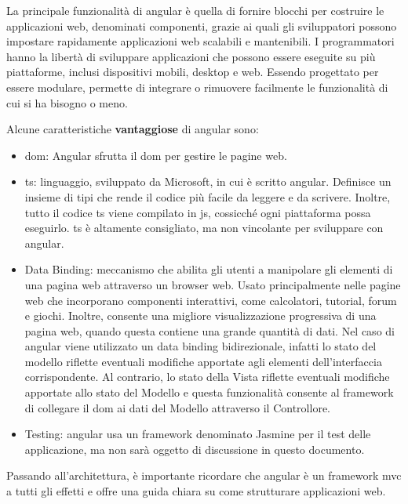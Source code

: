 La principale funzionalità di \gls{angular} è quella di fornire blocchi per costruire le applicazioni web, denominati componenti, grazie ai quali gli sviluppatori possono impostare rapidamente applicazioni web scalabili e mantenibili.
I programmatori hanno la libertà di sviluppare applicazioni che possono essere eseguite su più piattaforme, inclusi dispositivi mobili, desktop e web. Essendo progettato per essere modulare, permette di integrare o rimuovere facilmente le funzionalità di cui si ha bisogno o meno.

Alcune caratteristiche \textbf{vantaggiose} di \gls{angular} sono:
\begin{itemize}
    \item \acrlong{dom}: Angular sfrutta il \acrshort{dom} per gestire le pagine web.
    \item \acrfull{ts}: linguaggio, sviluppato da Microsoft, in cui è scritto \gls{angular}. Definisce un insieme di tipi che rende il codice più facile da leggere e da scrivere. Inoltre, tutto il codice \acrlong{ts} viene compilato in \acrlong{js}, cossicché ogni piattaforma possa eseguirlo. \acrlong{ts} è altamente consigliato, ma non vincolante per sviluppare con \gls{angular}.
    \item Data Binding: meccanismo che abilita gli utenti a manipolare gli elementi di una pagina web attraverso un browser web. Usato principalmente nelle pagine web che incorporano componenti interattivi, come calcolatori, tutorial, forum e giochi. Inoltre, consente una migliore visualizzazione progressiva di una pagina web, quando questa contiene una grande quantità di dati. Nel caso di \gls{angular} viene utilizzato un data binding bidirezionale, infatti lo stato del modello riflette eventuali modifiche apportate agli elementi dell'interfaccia corrispondente. Al contrario, lo stato della Vista riflette eventuali modifiche apportate allo stato del Modello e questa funzionalità consente al \gls{framework} di collegare il \acrshort{dom} ai dati del Modello attraverso il Controllore.
    \item Testing: \gls{angular} usa un \gls{framework} denominato Jasmine per il test delle applicazione, ma non sarà oggetto di discussione in questo documento.
\end{itemize}

Passando all'architettura, è importante ricordare che \gls{angular} è un \gls{framework} \acrshort{mvc} a tutti gli effetti e offre una guida chiara su come strutturare applicazioni web.

